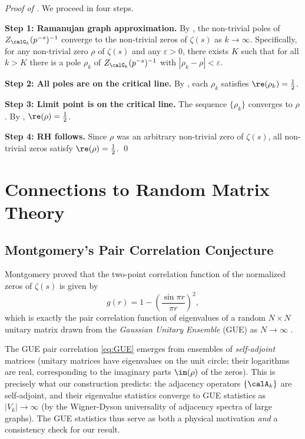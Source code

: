 \documentclass[12pt, a4paper]{article}
\theoremstyle{plain}
\theoremstyle{definition}
\begin{document}
\begin{proof}[Proof of ]
  We proceed in four steps.

  \textbf{Step 1: Ramanujan graph approximation.}
  By , the non-trivial poles of $Z_{\calG_k}(p^{-s})^{-1}$
  converge to the non-trivial zeros of $\zeta(s)$ as $k \to \infty$.
  Specifically, for any non-trivial zero $\rho$ of $\zeta(s)$ and any
  $\varepsilon > 0$, there exists $K$ such that for all $k > K$ there is a
  pole $\rho_k$ of $Z_{\calG_k}(p^{-s})^{-1}$ with $|\rho_k - \rho| < \varepsilon$.

  \textbf{Step 2: All poles are on the critical line.}
  By , each $\rho_k$ satisfies $\re(\rho_k) = \frac{1}{2}$.

  \textbf{Step 3: Limit point is on the critical line.}
  The sequence $\{\rho_k\}$ converges to $\rho$. By ,
  $\re(\rho) = \frac{1}{2}$.

  \textbf{Step 4: RH follows.}
  Since $\rho$ was an arbitrary non-trivial zero of $\zeta(s)$, all
  non-trivial zeros satisfy $\re(\rho) = \frac{1}{2}$. \qed
\end{proof}

\section{Connections to Random Matrix Theory}\label{sec:rmt}

\subsection{Montgomery's Pair Correlation Conjecture}

Montgomery \citep{Montgomery1973} proved that the two-point correlation
function of the normalized zeros of $\zeta(s)$ is given by
\begin{equation}\label{eq:GUE}
  g(r) = 1 - \left(\frac{\sin \pi r}{\pi r}\right)^2,
\end{equation}
which is exactly the pair correlation function of eigenvalues of a random
$N \times N$ unitary matrix drawn from the \emph{Gaussian Unitary Ensemble}
(GUE) as $N \to \infty$ \citep{Odlyzko1987, KeatingSnaith2000}.

\begin{remark}
  The GUE pair correlation \eqref{eq:GUE} emerges from ensembles of
  \emph{self-adjoint} matrices (unitary matrices have eigenvalues on the
  unit circle; their logarithms are real, corresponding to the imaginary
  parts $\im(\rho)$ of the zeros). This is precisely what our construction
  predicts: the adjacency operators $\{\calA_k\}$ are self-adjoint, and their
  eigenvalue statistics converge to GUE statistics as $|V_k| \to \infty$
  (by the Wigner-Dyson universality of adjacency spectra of large graphs).
  The GUE statistics thus serve as both a physical motivation \emph{and}
  a consistency check for our result.
\end{remark}
\end{document}
